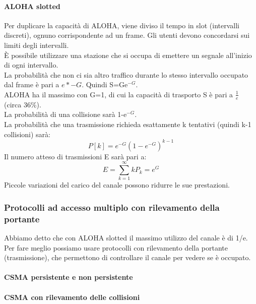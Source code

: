 \documentclass{article}
\begin{document}
\paragraph{ALOHA slotted}
Per duplicare la capacità di ALOHA, viene diviso il tempo in slot (intervalli discreti), ognuno corrispondente ad un frame. Gli utenti devono concordarsi sui limiti degli intervalli.\\
È possibile utilizzare una stazione che si occupa di emettere un segnale all'inizio di ogni intervallo. \\
La probabilità che non ci sia altro traffico durante lo stesso intervallo occupato dal frame è pari a $e*{-G}$. Quindi S=Ge$^{-G}$.
\\ALOHA ha il massimo con G=1, di cui la capacità di trasporto S è pari a $\frac{1}{e}$ (circa 36\%).\\
La probabilità di una collisione sarà 1-e$^{-G}$. \\
La probabilità che una trasmissione richieda esattamente k tentativi (quindi k-1 collisioni) sarà:
\begin{equation}
P[k] = e^{-G}(1-e^{-G})^{k-1}
\end{equation}
Il numero atteso di trasmissioni E sarà pari a:
\begin{equation}
E = \sum_{k=1}^\infty kP_k = e^G
\end{equation}
Piccole variazioni del carico del canale possono ridurre le sue prestazioni.\\
\subsubsection{Protocolli ad accesso multiplo con rilevamento della portante}
Abbiamo detto che con ALOHA slotted il massimo utilizzo del canale è di 1/e.\\
Per fare meglio possiamo usare protocolli con rilevamento della portante (trasmissione), che permettono di controllare il canale per vedere se è occupato.\\
\paragraph{CSMA persistente e non persistente}
\paragraph{CSMA con rilevamento delle collisioni}
\end{document}
